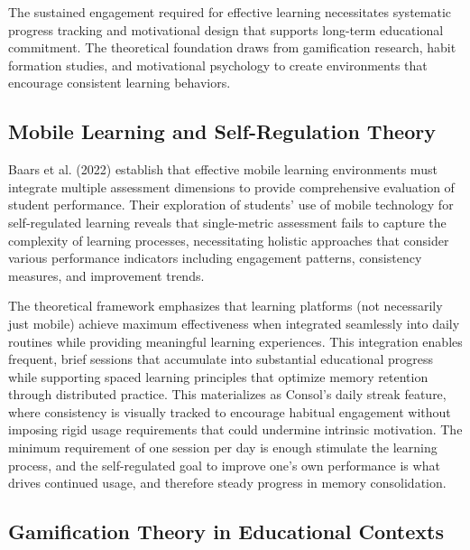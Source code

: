 {\color{maroon}
The sustained engagement required for effective learning necessitates systematic progress tracking and motivational design that supports long-term educational commitment. The theoretical foundation draws from gamification research, habit formation studies, and motivational psychology to create environments that encourage consistent learning behaviors.




\subsection{Mobile Learning and Self-Regulation Theory}

Baars et al. (2022) establish that effective mobile learning environments must integrate multiple assessment dimensions to provide comprehensive evaluation of student performance. Their exploration of students' use of mobile technology for self-regulated learning reveals that single-metric assessment fails to capture the complexity of learning processes, necessitating holistic approaches that consider various performance indicators including engagement patterns, consistency measures, and improvement trends.

The theoretical framework emphasizes that learning platforms (not necessarily just mobile) achieve maximum effectiveness when integrated seamlessly into daily routines while providing meaningful learning experiences. This integration enables frequent, brief sessions that accumulate into substantial educational progress while supporting spaced learning principles that optimize memory retention through distributed practice. This materializes as Consol's daily streak feature, where consistency is visually tracked to encourage habitual engagement without imposing rigid usage requirements that could undermine intrinsic motivation. The minimum requirement of one session per day is enough stimulate the learning process, and the self-regulated goal to improve one's own performance is what drives continued usage, and therefore steady progress in memory consolidation.
}






\subsection{Gamification Theory in Educational Contexts}


